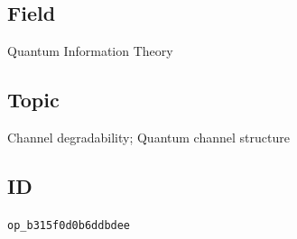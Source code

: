 \subsection*{Field}

Quantum Information Theory

\subsection*{Topic}

Channel degradability; Quantum channel structure

\subsection*{ID}

\texttt{op\_b315f0d0b6ddbdee}
